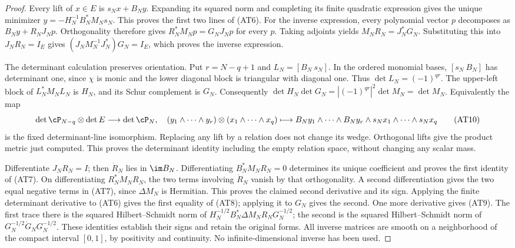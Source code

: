 \documentclass[10pt,a4paper,oneside]{report}
\begin{document}
\begin{proof}
Every lift of $x\in E$ is $s_Nx+B_Ny$. Expanding its squared norm
and completing its finite quadratic expression gives the unique
minimizer $y=-H_N^{-1}B_N^*M_Ns_N$. This proves the first two
lines of (AT6). For the inverse expression, every polynomial vector
$p$ decomposes as $B_Ny+R_NJ_Np$. Orthogonality therefore gives
$R_N^*M_Np=G_NJ_Np$ for every $p$. Taking adjoints yields
$M_NR_N=J_N^*G_N$. Substituting this into $J_NR_N=I_E$ gives
$(J_NM_N^{-1}J_N^*)G_N=I_E$, which proves the inverse expression.

The determinant calculation preserves orientation. Put
$r=N-q+1$ and $L_N=[B_N\ s_N]$. In the ordered monomial bases,
$[s_N\ B_N]$ has determinant one, since $\chi$ is monic and the
lower diagonal block is triangular with diagonal one. Thus
$\det L_N=(-1)^{qr}$. The upper-left block of $L_N^*M_NL_N$
is $H_N$, and its Schur complement is $G_N$. Consequently
$\det H_N\det G_N=|(-1)^{qr}|^2\det M_N=\det M_N$.
Equivalently the map
\[
 \det\cP_{N-q}\otimes\det E\longrightarrow\det\cP_N,
 \quad (y_1\wedge\cdots\wedge y_r)\otimes(x_1\wedge\cdots\wedge x_q)
 \longmapsto
 B_Ny_1\wedge\cdots\wedge B_Ny_r\wedge s_Nx_1\wedge\cdots\wedge s_Nx_q
                                                        \tag{AT10}
\]
is the fixed determinant-line isomorphism. Replacing any lift by a
relation does not change its wedge. Orthogonal lifts give the product
metric just computed. This proves the determinant identity including
the empty relation space, without changing any scalar mass.

Differentiate $J_NR_N=I$; then $\dot R_N$ lies in $\im B_N$.
Differentiating $B_N^*M_NR_N=0$ determines its unique coefficient
and proves the first identity of (AT7). On differentiating
$R_N^*M_NR_N$, the two terms involving $\dot R_N$ vanish by
that orthogonality. A second differentiation gives the two equal
negative terms in (AT7), since $\Delta M_N$ is Hermitian. This
proves the claimed second derivative and its sign. Applying the
finite determinant derivative to (AT6) gives the first equality
of (AT8); applying it to $G_N$ gives the second.
One more derivative gives (AT9). The first trace there is the squared
Hilbert--Schmidt norm of
$H_N^{-1/2}B_N^*\Delta M_NR_NG_N^{-1/2}$; the second is the
squared Hilbert--Schmidt norm of
$G_N^{-1/2}\dot G_NG_N^{-1/2}$. These identities establish their
signs and retain the original forms. All inverse matrices are smooth
on a neighborhood of the compact interval $[0,1]$, by positivity
and continuity. No infinite-dimensional inverse has been used.
\end{proof}
\end{document}
